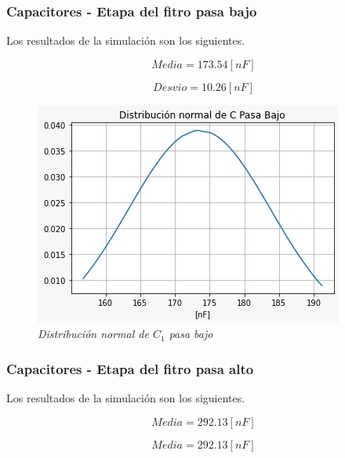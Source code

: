 \documentclass[12pt,A4paper,titlepage]{article}
\begin{document}
\bigskip

\newpage
\subsubsection{Capacitores - Etapa del fitro pasa bajo}
\hspace{1mm} Los resultados de la simulación son los siguientes.

\begin{equation}
   \boxed{ Media = 173.54 [nF] }    
\end{equation}

\begin{equation}
    \boxed{Desvio = 10.26 [nF]}
\end{equation} 

\begin{figure}[!h] 
  \centering
  \includegraphics[scale=0.7]{Imagenes/Distribución normal de C pasa bajo.png}
  \caption{\textit{Distribución normal de \(C_1\) pasa bajo}}
\end{figure}

\subsubsection{Capacitores - Etapa del fitro pasa alto}
\hspace{1mm} Los resultados de la simulación son los siguientes.

\begin{equation}
    \boxed{Media = 292.13 [nF]}    
\end{equation}

\begin{equation}
    \boxed{Media = 292.13 [nF]}
\end{equation}
\end{document}
